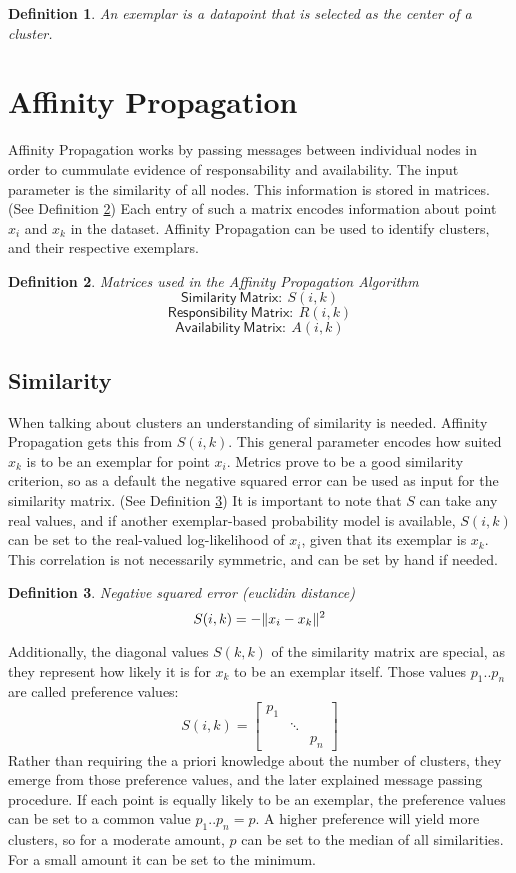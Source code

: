 \documentclass[11pt,a4paper]{article}
\newtheorem{definition}{Definition}
\DeclarePairedDelimiter\norm{\lVert}{\rVert}
\begin{document}
\begin{definition}\label{def:exemplar}
	An exemplar is a datapoint that is selected as the center of a cluster.
\end{definition}

\pagebreak
\section{Affinity Propagation}

Affinity Propagation works by passing messages between individual nodes in order to cummulate evidence of responsability and availability. The input parameter is the similarity of all nodes. This information is stored in matrices. (See Definition \ref{def:matrices}) Each entry of such a matrix encodes information about point $x_i$ and $x_k$ in the dataset. Affinity Propagation can be used to identify clusters, and their respective exemplars.
\begin{definition}\label{def:matrices}
	Matrices used in the Affinity Propagation Algorithm
	\[
		\mathsf{Similarity\ Matrix:}\  S(i,k) 
	\]
	\[
		\mathsf{Responsibility\ Matrix:}\  R(i,k) 
	\]
	\[
		\mathsf{Availability\ Matrix:}\  A(i,k) 
	\]
\end{definition}
\subsection{Similarity}
When talking about clusters an understanding of similarity is needed. Affinity Propagation gets this from $S(i,k)$. This general parameter encodes how suited $x_k$ is to be an exemplar for point $x_i$. Metrics prove to be a good similarity criterion, so as a default the negative squared error can be used as input for the similarity matrix. \cite{frey2007clustering} (See Definition \ref{def:negsquared}) It is important to note that $S$ can take any real values, and if another exemplar-based probability model is available, $S(i,k)$ can be set to the real-valued log-likelihood of $x_i$, given that its exemplar is $x_k$. This correlation is not necessarily symmetric, and can be set by hand if needed. \cite{frey2007clustering}
\begin{definition}\label{def:negsquared}
	Negative squared error (euclidin distance)
	\[
		S(i,k) = - \norm{x_i - x_k}^2
	\]
\end{definition}
Additionally, the diagonal values $S(k,k)$ of the similarity matrix are special, as they represent how likely it is for $x_k$ to be an exemplar itself. Those values $p_1 .. p_n$ are called preference values:
\[
	S(i,k) = \begin{bmatrix}p_{1} & & \\ & \ddots & \\ & & p_{n}\end{bmatrix}
\]
Rather than requiring the a priori knowledge about the number of clusters, they emerge from those preference values, and the later explained message passing procedure. If each point is equally likely to be an exemplar, the preference values can be set to a common value $p_1..p_n = p$. A higher preference will yield more clusters, so for a moderate amount, $p$ can be set to the median of all similarities. For a small amount it can be set to the minimum. \cite{frey2007clustering}
\end{document}
